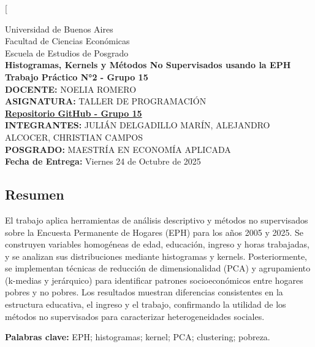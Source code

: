 \documentclass[9pt, twocolumn]{article}
\begin{document}
	\twocolumn[{
		\begin{center}
			\Large Universidad de Buenos Aires \\[0.2cm]
			\large Facultad de Ciencias Económicas \\[0.2cm]
			Escuela de Estudios de Posgrado \\[0.4cm]
			\Large \textbf{Histogramas, Kernels y Métodos No Supervisados usando la EPH} \\[0.4cm]
			\textbf{Trabajo Práctico N°2 - Grupo 15} \\[0.4cm]
			\normalsize \textbf{DOCENTE:} NOELIA ROMERO \\[0.6cm]
			\Large \textbf{ASIGNATURA:} TALLER DE PROGRAMACIÓN \\[0.5cm]   \noindent\textbf{\href{https://github.com/delgadiljulian/taller-de-programacion-uba-2025-grupo15}{Repositorio GitHub - Grupo 15}} \\[0.5cm]
			\normalsize \textbf{INTEGRANTES:} JULIÁN DELGADILLO MARÍN, ALEJANDRO ALCOCER, CHRISTIAN CAMPOS \\[0.2cm]
			\textbf{POSGRADO:} MAESTRÍA EN ECONOMÍA APLICADA \\[0.4cm]
			\textbf{Fecha de Entrega:} Viernes 24 de Octubre de 2025
			\vspace*{1cm}
	\end{center}}

	\begin{center}
		\section*{Resumen}
	\end{center}

	\justify
	El trabajo aplica herramientas de análisis descriptivo y métodos no supervisados sobre la Encuesta Permanente de Hogares (EPH) para los años 2005 y 2025.
	Se construyen variables homogéneas de edad, educación, ingreso y horas trabajadas, y se analizan sus distribuciones mediante histogramas y kernels.
	Posteriormente, se implementan técnicas de reducción de dimensionalidad (PCA) y agrupamiento (k-medias y jerárquico) para identificar patrones socioeconómicos entre hogares pobres y no pobres.
	Los resultados muestran diferencias consistentes en la estructura educativa, el ingreso y el trabajo, confirmando la utilidad de los métodos no supervisados para caracterizar heterogeneidades sociales.

	\vspace{0.3cm}
	\noindent\textbf{Palabras clave:} EPH; histogramas; kernel; PCA; clustering; pobreza.
	\vspace{1cm}
\end{document}
